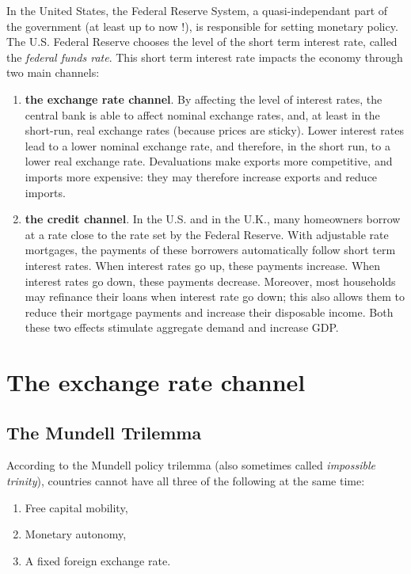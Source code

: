 \documentclass[]{book}
\providecommand{\tightlist}{%
  \setlength{\itemsep}{0pt}\setlength{\parskip}{0pt}}
\begin{document}
In the United States, the Federal Reserve System, a quasi-independant
part of the government (at least up to now !), is responsible for
setting monetary policy. The U.S. Federal Reserve chooses the level of
the short term interest rate, called the \emph{federal funds rate}. This
short term interest rate impacts the economy through two main channels:

\begin{enumerate}
\def\labelenumi{\arabic{enumi}.}
\item
  \textbf{the exchange rate channel}. By affecting the level of interest
  rates, the central bank is able to affect nominal exchange rates, and,
  at least in the short-run, real exchange rates (because prices are
  sticky). Lower interest rates lead to a lower nominal exchange rate,
  and therefore, in the short run, to a lower real exchange rate.
  Devaluations make exports more competitive, and imports more
  expensive: they may therefore increase exports and reduce imports.
\item
  \textbf{the credit channel}. In the U.S. and in the U.K., many
  homeowners borrow at a rate close to the rate set by the Federal
  Reserve. With adjustable rate mortgages, the payments of these
  borrowers automatically follow short term interest rates. When
  interest rates go up, these payments increase. When interest rates go
  down, these payments decrease. Moreover, most households may refinance
  their loans when interest rate go down; this also allows them to
  reduce their mortgage payments and increase their disposable income.
  Both these two effects stimulate aggregate demand and increase GDP.
\end{enumerate}

\section{The exchange rate channel}\label{the-exchange-rate-channel}

\subsection{The Mundell Trilemma}\label{the-mundell-trilemma}

According to the Mundell policy trilemma (also sometimes called
\emph{impossible trinity}), countries cannot have all three of the
following at the same time:

\begin{enumerate}
\def\labelenumi{\arabic{enumi}.}
\tightlist
\item
  Free capital mobility,
\item
  Monetary autonomy,
\item
  A fixed foreign exchange rate.
\end{enumerate}
\end{document}
